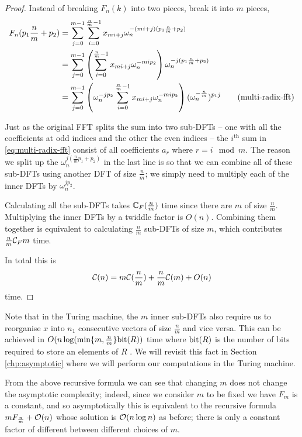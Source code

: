 \begin{proof}
    Instead of breaking $F_n(k)$ into two pieces, break it into $m$ pieces,
    \begin{align}
        F_n(p_1\frac{n}{m} + p_2) 
        &= \sum^{m-1}_{j=0} \sum^{\frac{n}{m}-1}_{i=0} x_{mi + j}\omega_n^{-(mi + j)(p_1 \frac{n}{m} + p_2)}\\ \nonumber
        &= \sum^{m-1}_{j=0} \left(\sum^{\frac{n}{m}-1}_{i=0} x_{mi + j}\omega_n^{-mi p_2}\right) \omega_n^{-j(p_1\frac{n}{m} + p_2)}\\\nonumber
        &= \sum^{m-1}_{j=0} \left(\omega_n^{-jp_2}\sum^{\frac{n}{m}-1}_{i=0} x_{mi + j}\omega_n^{-mi p_2}\right) (\omega_n^{-\frac{n}{m}})^{p_1 j} \tag{multi-radix-fft}\label{eq:multi-radix-fft}
    \end{align}

    Just as the original FFT splits the sum into two sub-DFTs -- one with all the coefficients at odd indices and the other the even indices -- the $i^{\text{th}}$ sum in \eqref{eq:multi-radix-fft} consist of all coefficients $a_r$ where $r = i \mod m$. The reason we split up the $\omega_n^{j(\frac{n}{m}p_1 + p_2)}$ in the last line is so that we can combine all of these sub-DFTs using another DFT of size $\frac{n}{m}$; we simply need to multiply each of the inner DFTs by $\omega_n^{jp_2}$.

    Calculating all the sub-DFTs takes ${\mathbb C}_F(\frac{n}{m})$ time since there are $m$ of size $\frac{n}{m}$. Multiplying the inner DFTs by a twiddle factor is $O(n)$. Combining them together is equivalent to calculating $\frac{n}{m}$ sub-DFTs of size $m$, which contributes $\frac{n}{m}\mathcal C_F{m}$ time.

    In total this is
    \[
        \mathcal C(n) = m\mathcal C(\frac{n}{m}) + \frac{n}{m}\mathcal C(m) + O(n)
    \]
    time.
\end{proof}

Note that in the Turing machine, the $m$ inner sub-DFTs also require us to reorganise $x$ into $n_1$ consecutive vectors of size $\frac{n}{m}$ and vice versa. This can be achieved in $O(n \log( \min \{m, \frac{n}{m}\}\textrm{bit}(R))$ time where $\textrm{bit}(R)$ is the number of bits required to store an elements of $R$ \cite{ffnlogn}. We will revisit this fact in Section \ref{chp:asymptotic} where we will perform our computations in the Turing machine.

From the above recursive formula we can see that changing $m$ does not change the asymptotic complexity; indeed, since we consider $m$ to be fixed we have $F_m$ is a constant, and so asymptotically this is equivalent to the recursive formula $mF_{\frac{n}{m}} + \mathcal O(n)$ whose solution is $\mathcal O(n \log n)$ as before; there is only a constant factor of different between different choices of $m$.

